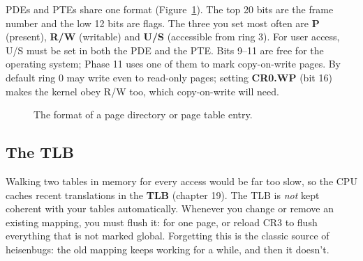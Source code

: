 \documentclass[11pt,a4paper]{article}
\begin{document}
PDEs and PTEs share one format (Figure~\ref{fig:pte}). The top 20 bits are the frame number and the low 12 bits are
flags. The three you set most often are \textbf{P} (present), \textbf{R/W} (writable) and \textbf{U/S} (accessible
from ring 3). For user access, U/S must be set in both the PDE and the PTE. Bits 9--11 are free for the operating
system; Phase 11 uses one of them to mark copy-on-write pages. By default ring 0 may write even to read-only pages;
setting \textbf{CR0.WP} (bit 16) makes the kernel obey R/W too, which copy-on-write will need.

\begin{figure}[htbp]
\centering
{}
\caption{The format of a page directory or page table entry.}
\label{fig:pte}
\end{figure}

\subsection{The TLB}

Walking two tables in memory for every access would be far too slow, so the CPU caches recent translations in the
\textbf{TLB} (\OSTEP chapter 19). The TLB is \emph{not} kept coherent with your tables automatically. Whenever you
change or remove an existing mapping, you must flush it:  for one page, or reload CR3 to flush
everything that is not marked global. Forgetting this is the classic source of heisenbugs: the old mapping keeps
working for a while, and then it doesn't.
\end{document}
